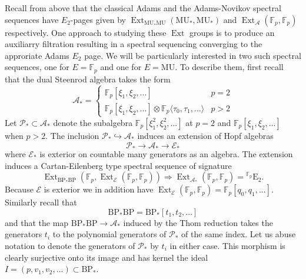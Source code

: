 \documentclass[10pt]{amsart}
\theoremstyle{definition}
\numberwithin{figure}{section}
\numberwithin{equation}{section}
\newcommand{\cA}{\mathcal{A}}
\newcommand{\cE}{\mathcal{E}}
\newcommand{\cP}{\mathcal{P}}
\newcommand{\MU}{\mathrm{MU}}
\newcommand{\BP}{\mathrm{BP}}
\newcommand{\Ext}{\operatorname{Ext}}
\newcommand{\genanss}[1]{{}^{\mathrm{#1}}\mathrm{E}}
\theoremstyle{cited}
\newcommand{\bF}{\mathbb{F}}
\begin{document}
Recall from above that the classical Adams and the Adams-Novikov spectral sequences have $E_2$-pages given by $\Ext_{\MU_*\MU}(\MU_*,\MU_*)$ and $\Ext_{\cA}(\bF_p,\bF_p)$ respectively. One approach to studying these $\Ext$ groups is to produce an auxiliarry filtration resulting in a spectral sequencing converging to the approriate Adams $E_2$ page. We will be particularly interested in two such spectral sequences, one for $E=\bF_p$ and one for $E=\MU$. To describe them, first recall that the dual Steenrod algebra takes the form
\[
\cA_* =\begin{cases}
    \bF_p[\xi_1,\xi_2,...] & p=2\\
    \bF_p[\xi_1,\xi_2,...] \otimes \bF_p\langle \tau_0,\tau_1,...\rangle & p >2
\end{cases}
\]
Let $\cP_*\subset \cA_*$ denote the subalgebra $\bF_p[\xi_1^2,\xi_2^2,...]$ at $p=2$ and $\bF_p[\xi_1,\xi_2,...]$ when $p>2$. The inclusion $\cP_*\hookrightarrow \cA_*$ induces an extension of Hopf algebras
\[
  \cP_* \to \cA_* \to \cE_*
\]
where $\cE_*$ is exterior on countable many generators as an algebra. The extension induces a Cartan-Eilenberg \cite{todo} type spectral sequence of signature
\[
  \Ext_{\BP_*\BP}(\bF_p, \Ext_{\cE}(\bF_p,\bF_p))\Rightarrow \Ext_{\cA_*}(\bF_p,\bF_p) =\genanss{\bF_p}_2.
\]
Because $\cE$ is exterior we in addition have $\Ext_{\cE}(\bF_p,\bF_p)=\bF_p[q_0,q_1,...]$. Similarly recall that 
\[
  \BP_*\BP=\BP_*[t_1,t_2,...]
\]
and that the map $\BP_*\BP\to \cA_*$ induced by the Thom reduction takes the generators $t_i$ to the polynomial generators of $\cP_*$ of the same index. Let us abuse notation to denote the generators of $\cP_*$ by $t_i$ in either case. This morphism is clearly surjective onto its image and has kernel the ideal $I=(p,v_1,v_2,...)\subset \BP_*$.
\end{document}
